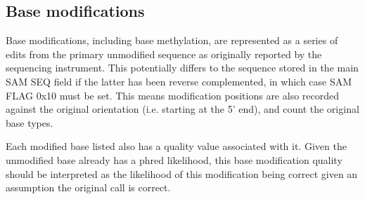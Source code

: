 \documentclass[10pt]{article}
\begin{document}
\subsection{Base modifications}

Base modifications, including base methylation, are represented as a series of edits from the primary unmodified sequence as originally reported by the sequencing instrument.
This potentially differs to the sequence stored in the main SAM {\sf SEQ} field if the latter has been reverse complemented, in which case SAM {\sf FLAG} 0x10 must be set.
This means modification positions are also recorded against the original orientation (i.e. starting at the 5' end), and count the original base types.

Each modified base listed also has a quality value associated with it.
Given the unmodified base already has a phred likelihood, this base modification quality should be interpreted as the likelihood of this modification being correct given an assumption the original call is correct.
\end{document}
